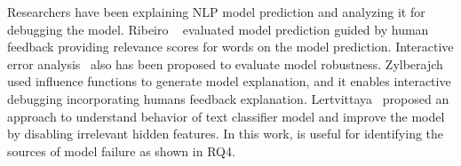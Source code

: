 %
Researchers have been explaining NLP model prediction and
analyzing it for debugging the model. Ribeiro
\textit{\etal}~\cite{ribeiroSG16lime} evaluated model prediction guided by human feedback providing relevance scores for words on the model prediction. 
Interactive error analysis~\cite{wu2019errudite} also has been proposed to evaluate
model robustness. Zylberajch~\cite{zylberajch2021hildif} used influence functions to generate model explanation, and it enables interactive debugging incorporating humans feedback
explanation.
Lertvittaya~\cite{lertvittayakumjorn2020find} proposed
an approach to understand behavior of text classifier model and improve the
model by disabling irrelevant hidden features. In this work, \tool
is useful for identifying the sources of model failure as shown in RQ4.
